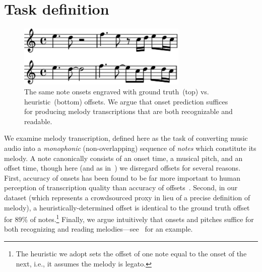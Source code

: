 \section{Task definition}

\begin{figure}
    \centering
    \includegraphics[width=8.1cm]{figs/heuristic_offsets.pdf}
    \caption{
The same note onsets engraved with ground truth~(top) vs. heuristic~(bottom) offsets. 
We argue that onset prediction suffices for producing melody transcriptions that are both recognizable and readable. 
}
 \label{fig:heuristic_offsets}
\end{figure}


We examine melody transcription, defined here as the task of converting music audio into a \emph{monophonic} (non-overlapping) sequence of \emph{notes} which constitute its melody. 
A note canonically consists of an onset time, a musical pitch, and an offset time, though here (and as in~\cite{laaksonen2014automatic}) we disregard offsets for several reasons. 
First, accuracy of onsets has been found to be far more important to human perception of transcription quality than accuracy of offsets~\cite{ycart2020investigating}. 
Second, in our dataset (which represents a crowdsourced proxy in lieu of a precise definition of melody), a heuristically-determined offset is identical to the ground truth offset for $89\%$ of notes.\footnote{The heuristic we adopt sets the offset of one note equal to the onset of the next, i.e., it assumes the melody is legato.}
Finally, we argue intuitively that onsets and pitches suffice for both recognizing and reading melodies---see~ for an example. 


